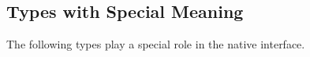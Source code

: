 %



\subsection*{Types with Special Meaning}

The following types play a special role in the native interface.

